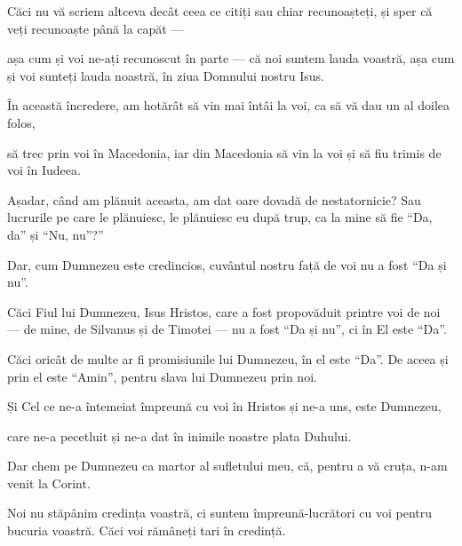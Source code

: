 {Căci nu vă scriem altceva decât ceea ce citiți sau chiar recunoașteți, și sper că veți recunoaște până la capăt —

așa cum și voi ne-ați recunoscut în parte — că noi suntem lauda voastră, așa cum și voi sunteți lauda noastră, în ziua Domnului nostru Isus.


\par }{\PP {}În această încredere, am hotărât să vin mai întâi la voi, ca să vă dau un al doilea folos,

să trec prin voi în Macedonia, iar din Macedonia să vin la voi și să fiu trimis de voi în Iudeea.

Așadar, când am plănuit aceasta, am dat oare dovadă de nestatornicie? Sau lucrurile pe care le plănuiesc, le plănuiesc eu după trup, ca la mine să fie “Da, da” și “Nu, nu”?”

Dar, cum Dumnezeu este credincios, cuvântul nostru față de voi nu a fost “Da și nu”.

Căci Fiul lui Dumnezeu, Isus Hristos, care a fost propovăduit printre voi de noi — de mine, de Silvanus și de Timotei — nu a fost “Da și nu”, ci în El este “Da”.

Căci oricât de multe ar fi promisiunile lui Dumnezeu, în el este “Da”. De aceea și prin el este “Amin”, pentru slava lui Dumnezeu prin noi.


\par }{\PP {}Și Cel ce ne-a întemeiat împreună cu voi în Hristos și ne-a uns, este Dumnezeu,

care ne-a pecetluit și ne-a dat în inimile noastre plata Duhului.


\par }{\PP {}Dar chem pe Dumnezeu ca martor al sufletului meu, că, pentru a vă cruța, n-am venit la Corint.

Noi nu stăpânim credința voastră, ci suntem împreună-lucrători cu voi pentru bucuria voastră. Căci voi rămâneți tari în credință.



\par }
